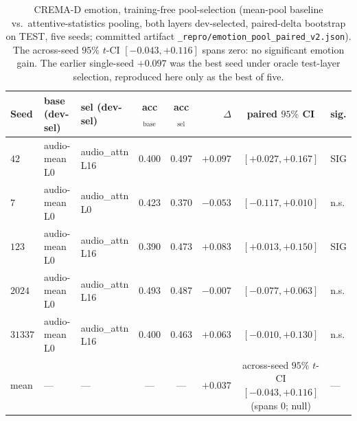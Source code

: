 \begin{table}[t]
\centering
\caption{CREMA-D emotion, training-free pool-selection (mean-pool baseline vs.\ attentive-statistics pooling, both layers dev-selected, paired-delta bootstrap on TEST, five seeds; committed artifact \texttt{\_repro/emotion\_pool\_paired\_v2.json}). The across-seed $95\%$ $t$-CI $[-0.043,+0.116]$ spans zero: no significant emotion gain. The earlier single-seed $+0.097$ was the best seed under oracle test-layer selection, reproduced here only as the best of five.}
\label{tab:emotion-multiseed}
\begin{tabular}{lllccrcl}
\toprule
Seed & base (dev-sel) & sel (dev-sel) & acc$_\text{base}$ & acc$_\text{sel}$ & $\Delta$ & paired $95\%$ CI & sig. \\
\midrule
$42$    & audio-mean L0 & audio\_attn L16 & 0.400 & 0.497 & $+0.097$ & $[+0.027,+0.167]$ & SIG \\
$7$     & audio-mean L0 & audio\_attn L0  & 0.423 & 0.370 & $-0.053$ & $[-0.117,+0.010]$ & n.s. \\
$123$   & audio-mean L0 & audio\_attn L16 & 0.390 & 0.473 & $+0.083$ & $[+0.013,+0.150]$ & SIG \\
$2024$  & audio-mean L0 & audio\_attn L16 & 0.493 & 0.487 & $-0.007$ & $[-0.077,+0.063]$ & n.s. \\
$31337$ & audio-mean L0 & audio\_attn L16 & 0.400 & 0.463 & $+0.063$ & $[-0.010,+0.130]$ & n.s. \\
\midrule
mean    & --- & --- & --- & --- & $+0.037$ & across-seed $95\%$ $t$-CI $[-0.043,+0.116]$ (spans $0$; null) & --- \\
\bottomrule
\end{tabular}
\end{table}

